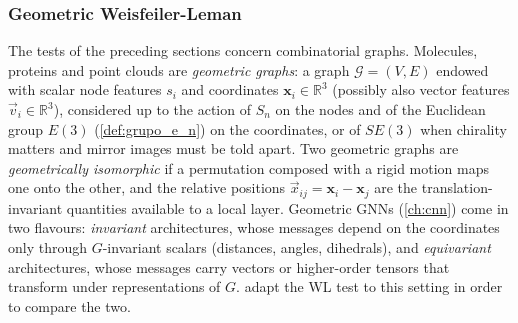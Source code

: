 \subsubsection{Geometric Weisfeiler-Leman}\label{subsubsec:wl_geometrico}

The tests of the preceding sections concern combinatorial graphs. Molecules, proteins and point clouds are \textit{geometric graphs}: a graph $\mathcal{G} = (V, E)$ endowed with scalar node features $s_i$ and coordinates $\mathbf{x}_i \in \mathbb{R}^3$ (possibly also vector features $\vec{v}_i \in \mathbb{R}^3$), considered up to the action of $S_n$ on the nodes and of the Euclidean group $E(3)$ (\autoref{def:grupo_e_n}) on the coordinates, or of $SE(3)$ when chirality matters and mirror images must be told apart. Two geometric graphs are \textit{geometrically isomorphic} if a permutation composed with a rigid motion maps one onto the other, and the relative positions $\vec{x}_{ij} = \mathbf{x}_i - \mathbf{x}_j$ are the translation-invariant quantities available to a local layer. Geometric \glspl{GNN} (\autoref{ch:cnn}) come in two flavours: \textit{invariant} architectures, whose messages depend on the coordinates only through $G$-invariant scalars (distances, angles, dihedrals), and \textit{equivariant} architectures, whose messages carry vectors or higher-order tensors that transform under representations of $G$. \citet{joshi2023expressive} adapt the WL test to this setting in order to compare the two.

